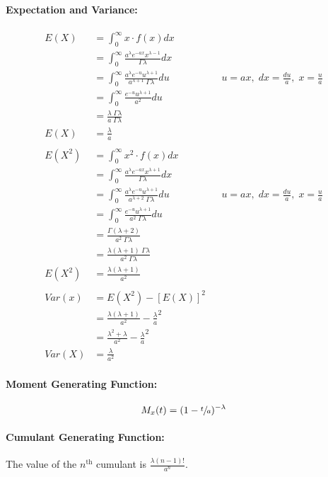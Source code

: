\documentclass[
10pt, %
a4paper, %
]{report}
\begin{document}
\paragraph{Expectation and Variance:}
\begin{align*}
    E(X) &= \int_0^\infty x \cdot f(x) dx \\
         &= \int_0^\infty\frac{a^\lambda e^{-ax} x^{\lambda -1}}{\Gamma \lambda} dx \\
         &= \int_0^\infty\frac{a^\lambda e^{-u} u^{\lambda+1}}{a^{\lambda+1}\;\Gamma \lambda} du && u=ax,\;dx=\frac{du}{a},\; x=\frac{u}{a}\\
         &= \int_0^\infty\frac{e^{-u} u^{\lambda+1}}{a^2} du \\
         &= \frac{\lambda\;\Gamma \lambda}{a\;\Gamma \lambda} \\
    E(X) &= \frac{\lambda}{a} \\ \\
    E(X^2) &= \int_0^\infty x^2 \cdot f(x) dx \\
         &= \int_0^\infty\frac{a^\lambda e^{-ax} x^{\lambda +1}}{\Gamma \lambda} dx \\
         &= \int_0^\infty\frac{a^\lambda e^{-u} u^{\lambda+1}}{a^{\lambda+2}\;\Gamma \lambda} du && u=ax,\;dx=\frac{du}{a},\; x=\frac{u}{a}\\
         &= \int_0^\infty\frac{e^{-u} u^{\lambda+1}}{a^2\;\Gamma \lambda} du \\
         &= \frac{\Gamma (\lambda+2)}{a^2\;\Gamma \lambda} \\
         &= \frac{\lambda(\lambda+1)\;\Gamma \lambda}{a^2\;\Gamma \lambda} \\
    E(X^2) &= \frac{\lambda(\lambda+1)}{a^2} \\ \\
    Var(x) &= E(X^2) - [E(X)]^2 \\
           &= \frac{\lambda(\lambda+1)}{a^2} - \frac{\lambda}{a}^2 \\
           &= \frac{\lambda^2+\lambda}{a^2} - \frac{\lambda}{a}^2 \\
    Var(X) &= \frac{\lambda}{a^2}
\end{align*}

\paragraph{Moment Generating Function:}
\[
M_x(t)=(1-\sfrac{t}{a})^{-\lambda}
\]

\paragraph{Cumulant Generating Function:}
The value of the \(n^{\text{th}}\) cumulant is \(\frac{\lambda(n-1)!}{a^n}\).
\end{document}
